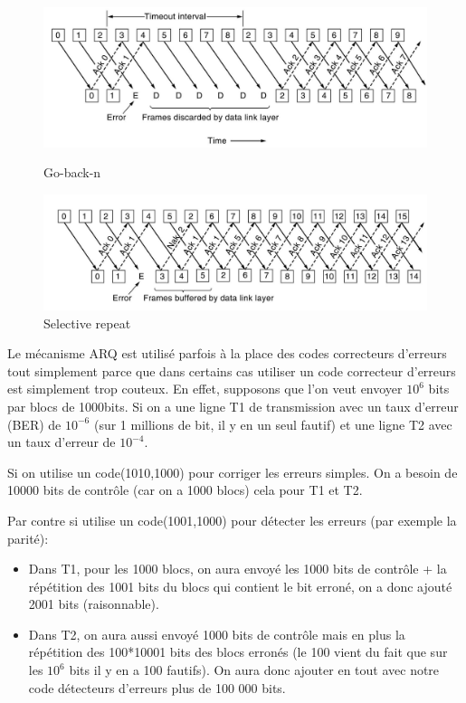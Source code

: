 \begin{figure}[H]
\begin{minipage}[b]{0.6\linewidth}
        \centering
        \begin{minipage}[t]{\linewidth}
            \centering
            \includegraphics[width=\linewidth]{img/go_back_n.png}
            \caption{Go-back-n}
        \end{minipage}
        \begin{minipage}[b]{\linewidth}
            \centering
            \includegraphics[width=\linewidth]{img/selective_repeat.png}
            \caption{Selective repeat}
        \end{minipage}
    \end{minipage}
\end{figure}

Le mécanisme ARQ est utilisé parfois à la place des codes correcteurs d'erreurs tout simplement parce que dans certains cas utiliser un code correcteur d'erreurs est simplement trop couteux. En effet, supposons que l'on veut envoyer $10^6$ bits par blocs de 1000bits. Si on a une ligne T1 de transmission avec un taux d'erreur (BER) de $10^{-6}$ (sur 1 millions de bit, il y en un seul fautif) et une ligne T2 avec un taux d'erreur de $10^{-4}$.

Si on utilise un code(1010,1000) pour corriger les erreurs simples. On a besoin de 10000 bits de contrôle (car on a 1000 blocs) cela pour T1 et T2.

Par contre si utilise un code(1001,1000) pour détecter les erreurs (par exemple la parité):
\begin{itemize}
	\item Dans T1,  pour les 1000 blocs, on aura envoyé les 1000 bits de contrôle + la répétition des 1001 bits du blocs qui contient le bit erroné, on a donc ajouté 2001 bits (raisonnable).
	\item Dans T2, on aura aussi envoyé 1000 bits de contrôle mais en plus la répétition des 100*10001 bits des blocs erronés (le 100 vient du fait que sur les $10^6$ bits il y en a 100 fautifs). On aura donc ajouter en tout avec notre code détecteurs d'erreurs plus de 100 000 bits.
\end{itemize}


